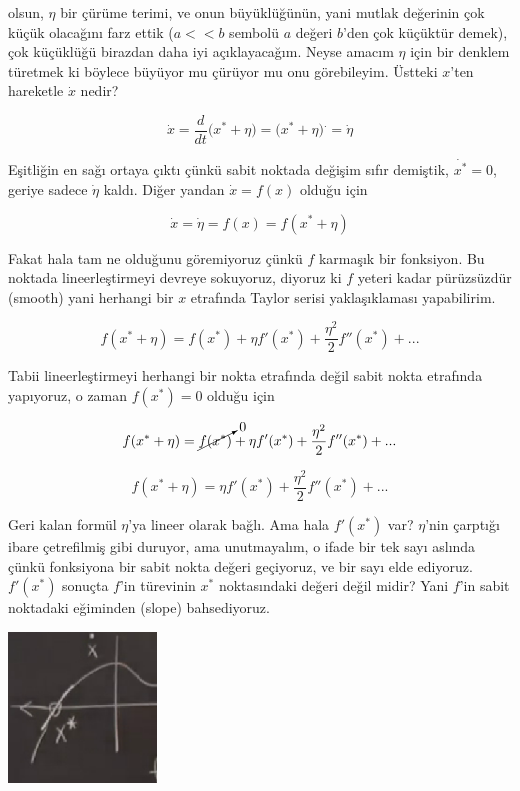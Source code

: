 \documentclass[12pt,fleqn]{article}\usepackage{../../common}
\begin{document}
olsun, $\eta$ bir çürüme terimi, ve onun büyüklüğünün, yani mutlak değerinin
çok küçük olacağını farz ettik ($a<<b$ sembolü $a$ değeri $b$'den çok küçüktür
demek), çok küçüklüğü birazdan daha iyi açıklayacağım. Neyse amacım $\eta$ için
bir denklem türetmek ki böylece büyüyor mu çürüyor mu onu görebileyim. Üstteki
$x$'ten hareketle $\dot{x}$ nedir?

$$ 
\dot{x} = \frac{d}{dt}( x^\ast + \eta \big) =
\big( x^\ast + \eta \big)^{\textbf{.}} = \dot{\eta} 
$$

Eşitliğin en sağı ortaya çıktı çünkü sabit noktada değişim sıfır demiştik,
$\dot{x^\ast} = 0$, geriye sadece $\dot{\eta}$ kaldı. Diğer yandan $\dot{x}=f(x)$
olduğu için

$$ 
\dot{x} = \dot{\eta} = f(x) = f(x^\ast + \eta) 
$$

Fakat hala tam ne olduğunu göremiyoruz çünkü $f$ karmaşık bir fonksiyon. Bu
noktada lineerleştirmeyi devreye sokuyoruz, diyoruz ki $f$ yeteri kadar
pürüzsüzdür (smooth) yani herhangi bir $x$ etrafında Taylor serisi
yaklaşıklaması yapabilirim. 

$$ 
f(x^\ast + \eta) = f(x^\ast) + \eta f'(x^\ast) + \frac{\eta^2}{2}f''(x^\ast) + ...
$$

Tabii lineerleştirmeyi herhangi bir nokta etrafında değil sabit nokta etrafında
yapıyoruz, o zaman $f(x^\ast)=0$ olduğu için

$$ 
f(x^\ast + \eta) = \cancelto{0}{f(x^\ast)} + \eta f'(x^\ast) +
\frac{\eta^2}{2}f''(x^\ast) + ...
$$

$$ f(x^\ast + \eta) =  \eta f'(x^\ast) + \frac{\eta^2}{2}f''(x^\ast) + ...$$

Geri kalan formül $\eta$'ya lineer olarak bağlı. Ama hala $f'(x^\ast)$ var?
$\eta$'nin çarptığı ibare çetrefilmiş gibi duruyor, ama unutmayalım, o ifade bir
tek sayı aslında çünkü fonksiyona bir sabit nokta değeri geçiyoruz, ve bir sayı
elde ediyoruz. $f'(x^\ast)$ sonuçta $f$'in türevinin $x^\ast$ noktasındaki değeri
değil midir? Yani $f$'in sabit noktadaki eğiminden (slope) bahsediyoruz.

\includegraphics[height=4cm]{02_02.png}
\end{document}
